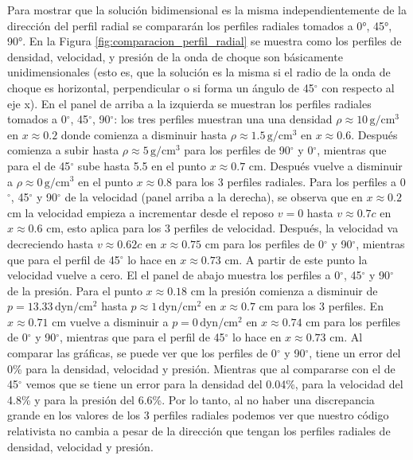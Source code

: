 \documentclass[12pt,a4paper]{book}
\begin{document}
Para mostrar que la solución bidimensional es la misma independientemente de la dirección del perfil
radial se compararán los perfiles radiales tomados a 0°, 45°, 90°. 
{\color{blue}En la Figura \ref{fig:comparacion_perfil_radial} se muestra como los perfiles de densidad, velocidad, y presión de la onda de choque son básicamente unidimensionales 
(esto es, que la solución es la misma si el radio de la onda de choque es horizontal, perpendicular o si forma un ángulo de 45$^{\circ}$ con respecto al eje x).} 
En el panel de arriba a la izquierda se muestran
los perfiles radiales tomados a 0$^{\circ}$, 45$^{\circ}$, 90$^{\circ}$: los tres perfiles muestran una
una densidad $\rho \approx 10 \, \text{g}/\text{cm}^3$ en $x \approx 0.2$ donde comienza a disminuir hasta $\rho \approx 1.5 \, \text{g}/\text{cm}^3$ en $x \approx 0.6$. Después comienza a subir hasta $\rho \approx 5 \, \text{g}/\text{cm}^3$ para los perfiles de 90$^{\circ}$ y 0$^{\circ}$, mientras que para el de 45$^{\circ}$ sube hasta 5.5 en el punto $x \approx 0.7$ cm. Después vuelve a disminuir a $\rho \approx 0 \, \text{g}/\text{cm}^3$ en el punto $x \approx 0.8$ para los 3 perfiles radiales.
Para los perfiles a 0$^{\circ}$, 45$^{\circ}$ y 90$^{\circ}$ de la velocidad (panel arriba a la derecha), se observa que en $x \approx 0.2$ cm la velocidad empieza a incrementar desde el reposo
$v = 0$ hasta $v \approx 0.7c$ en $x \approx 0.6$ cm, esto aplica para los 3 perfiles de velocidad. Después, la velocidad va decreciendo hasta $v \approx 0.62c$ en $x \approx 0.75$ cm para los perfiles de 0$^{\circ}$ y 90$^{\circ}$, mientras que para el perfil de 45$^{\circ}$ lo hace en $x \approx 0.73$ cm. A partir de este punto la velocidad vuelve a cero.
El el panel de abajo muestra los perfiles a 0$^{\circ}$, 45$^{\circ}$ y 90$^{\circ}$ de la presión. Para el punto $x \approx 0.18$ cm la presión comienza a disminuir de $p = 13.33 \,  \text{dyn}/ \text{cm}^2$  hasta $p \approx 1 \,  \text{dyn}/ \text{cm}^2$ en $x \approx 0.7$ cm para los 3 perfiles. En $x \approx 0.71 $ cm vuelve a disminuir a $p = 0 \,  \text{dyn}/ \text{cm}^2$ en $x \approx 0.74 $ cm para los perfiles de 
0$^{\circ}$ y 90$^{\circ}$, mientras que para el perfil de 45$^{\circ}$ lo hace en $x \approx 0.73 $ cm.
Al comparar las gráficas, se puede ver que los perfiles de 0$^{\circ}$ y 90$^{\circ}$, tiene un error del 0\% 
para la densidad, velocidad y presión. Mientras que
al compararse con el de 45$^{\circ}$ vemos que se tiene un error para la densidad del 0.04\%, para la velocidad del 4.8\% y para la presión del 6.6\%. Por lo tanto, al no haber una discrepancia grande en los valores de los 3 perfiles radiales podemos ver
que nuestro código relativista no cambia a pesar de la dirección que tengan los perfiles radiales de  densidad, velocidad y presión.
\end{document}
